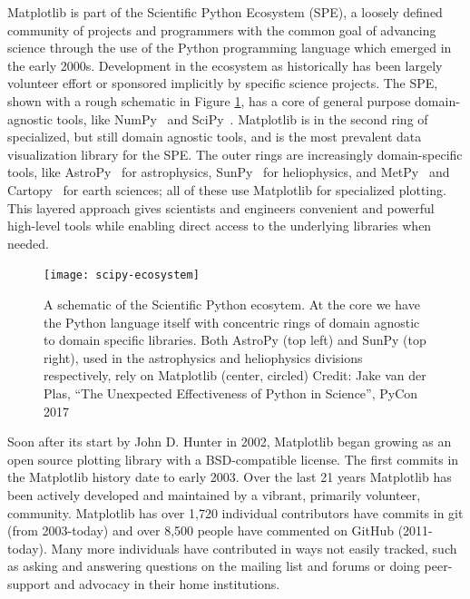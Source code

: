 \documentclass[12pt]{article}
\numberwithin{page}{section}
\begin{document}
Matplotlib is part of the Scientific Python Ecosystem (SPE), a loosely defined
community of projects and programmers with the common goal of advancing science
through the use of the Python programming language which emerged in the early
2000s.  Development in the ecosystem as historically has been largely volunteer
effort or sponsored implicitly by specific science projects.
The SPE, shown with a rough schematic in
Figure \ref{fig:ecosystem}, has a core of general purpose domain-agnostic
tools, like NumPy~\cite{Harris2020} and SciPy~\cite{Virtanen2020}.  Matplotlib
is in the second ring of specialized, but still domain agnostic tools, and is
the most prevalent data visualization library for the SPE.  The outer rings are
increasingly domain-specific tools, like AstroPy~\cite{astropy:2013,
  astropy:2018} for astrophysics, SunPy~\cite{sunpy_community2020} for
heliophysics, and MetPy~\cite{metpy} and Cartopy~\cite{Cartopy} for earth
sciences; all of these use Matplotlib for specialized plotting.
This layered approach gives scientists and engineers
convenient and powerful high-level tools while enabling direct access to the
underlying libraries when needed.


\begin{figure}
  \texttt{[image: scipy-ecosystem]}
  \caption{\small A schematic of the Scientific Python ecosytem.  At the
    core we have the Python language itself with concentric rings of
    domain agnostic to domain specific libraries.  Both AstroPy (top
    left) and SunPy (top right), used in the astrophysics and
    heliophysics divisions respectively, rely on Matplotlib (center, circled)
    Credit: Jake van der Plas, ``The Unexpected Effectiveness of Python
    in Science'', PyCon 2017}
  \label{fig:ecosystem}
\end{figure}


Soon after its start by John D. Hunter in 2002, Matplotlib began growing as an
open source plotting library with a BSD-compatible license. The first commits
in the Matplotlib history date to early 2003.  Over the last 21 years
Matplotlib has been actively developed and maintained by a vibrant, primarily
volunteer, community.  Matplotlib has over 1,720 individual contributors have
commits in git (from 2003-today) and over 8,500 people have commented on GitHub
(2011-today).  Many more individuals have contributed in ways not easily
tracked, such as asking and answering questions on the mailing list and forums
or doing peer-support and advocacy in their home institutions.
\end{document}
